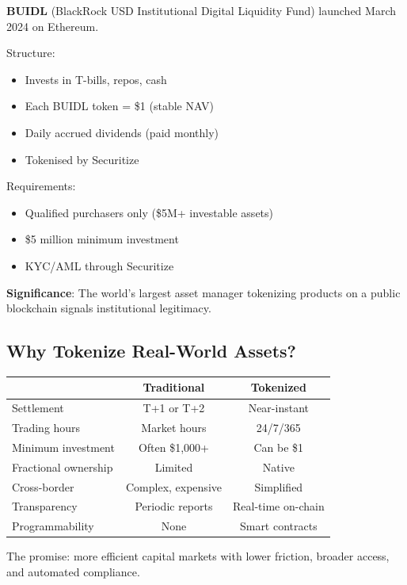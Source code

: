 \documentclass[11pt,a4paper]{article}
\begin{document}
\textbf{BUIDL} (BlackRock USD Institutional Digital Liquidity Fund) launched March 2024 on Ethereum.

Structure:
\begin{itemize}
    \item Invests in T-bills, repos, cash
    \item Each BUIDL token = \$1 (stable NAV)
    \item Daily accrued dividends (paid monthly)
    \item Tokenised by Securitize
\end{itemize}

Requirements:
\begin{itemize}
    \item Qualified purchasers only (\$5M+ investable assets)
    \item \$5 million minimum investment
    \item KYC/AML through Securitize
\end{itemize}

\textbf{Significance}: The world's largest asset manager tokenizing products on a public blockchain signals institutional legitimacy.

\subsection{Why Tokenize Real-World Assets?}

\begin{center}
\begin{tabular}{lcc}
\toprule
& \textbf{Traditional} & \textbf{Tokenized} \\
\midrule
Settlement & T+1 or T+2 & Near-instant \\
Trading hours & Market hours & 24/7/365 \\
Minimum investment & Often \$1,000+ & Can be \$1 \\
Fractional ownership & Limited & Native \\
Cross-border & Complex, expensive & Simplified \\
Transparency & Periodic reports & Real-time on-chain \\
Programmability & None & Smart contracts \\
\bottomrule
\end{tabular}
\end{center}

The promise: more efficient capital markets with lower friction, broader access, and automated compliance.
\end{document}
